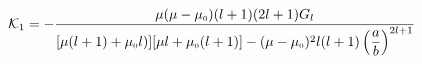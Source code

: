 





\begin{equation}\label{k1}
\mathcal{K}_1=-\frac{\mu(\mu-\mu_{\scriptscriptstyle 0})(l+1) (2l+1)G_l}{[\mu(l+1)+\mu_{\scriptscriptstyle 0} l)][\mu l+\mu_{\scriptscriptstyle 0}(l+1)]-(\mu-\mu_{\scriptscriptstyle 0})^2 l(l+1)\left(\dfrac{a}{b}\right)^{2l+1}}
\end{equation}



